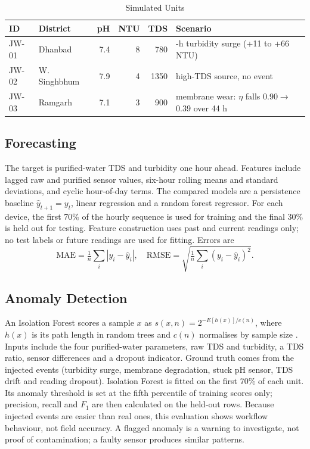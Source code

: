 \documentclass[10pt,letterpaper,twocolumn]{article}
\begin{document}
\begin{table}[t]
\caption{Simulated Units}
\centering\footnotesize
\begin{tabular}{@{}llrrr>{\raggedright\arraybackslash}p{1.2in}@{}}
\toprule
ID & District & pH & NTU & TDS & Scenario\\
\midrule
JW-01 & Dhanbad & 7.4 & 8 & 780 & 6-h turbidity surge (+11 to +66 NTU)\\
JW-02 & W. Singhbhum & 7.9 & 4 & 1350 & high-TDS source, no event\\
JW-03 & Ramgarh & 7.1 & 3 & 900 & membrane wear: $\eta$ falls 0.90$\to$0.39 over 44 h\\
\bottomrule
\end{tabular}
\end{table}

\subsection{Forecasting}
The target is purified-water TDS and turbidity one hour ahead. Features include lagged raw and purified sensor values, six-hour rolling means and standard deviations, and cyclic hour-of-day terms. The compared models are a persistence baseline $\hat y_{t+1}=y_t$, linear regression and a random forest regressor. For each device, the first 70\% of the hourly sequence is used for training and the final 30\% is held out for testing. Feature construction uses past and current readings only; no test labels or future readings are used for fitting. Errors are
\begin{equation}
\mathrm{MAE}=\tfrac1n\sum_i|y_i-\hat y_i|,\quad
\mathrm{RMSE}=\sqrt{\tfrac1n\sum_i(y_i-\hat y_i)^2}.
\end{equation}

\subsection{Anomaly Detection}
An Isolation Forest scores a sample $x$ as $s(x,n)=2^{-E[h(x)]/c(n)}$, where $h(x)$ is its path length in random trees and $c(n)$ normalises by sample size \cite{liu2008}. Inputs include the four purified-water parameters, raw TDS and turbidity, a TDS ratio, sensor differences and a dropout indicator. Ground truth comes from the injected events (turbidity surge, membrane degradation, stuck pH sensor, TDS drift and reading dropout). Isolation Forest is fitted on the first 70\% of each unit. Its anomaly threshold is set at the fifth percentile of training scores only; precision, recall and $F_1$ are then calculated on the held-out rows. Because injected events are easier than real ones, this evaluation shows workflow behaviour, not field accuracy. A flagged anomaly is a warning to investigate, not proof of contamination; a faulty sensor produces similar patterns.
\end{document}
